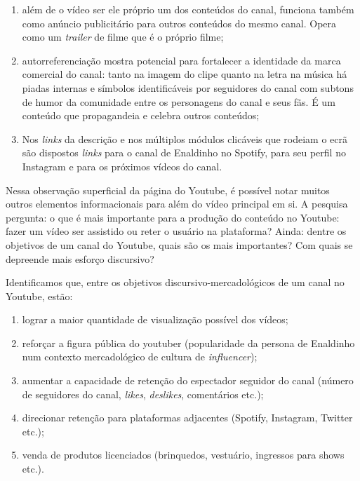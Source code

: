 \documentclass[portuguese]{textolivre}
\begin{document}
 \begin{enumerate}
     \item além de o vídeo ser ele próprio um dos conteúdos do canal, funciona também como anúncio publicitário para outros conteúdos do mesmo canal. Opera como um \textit{trailer} de filme que é o próprio filme;
     \item autorreferenciação mostra potencial para fortalecer a identidade da marca comercial do canal: tanto na imagem do clipe quanto na letra na música há piadas internas e símbolos identificáveis por seguidores do canal com subtons de humor da comunidade entre os personagens do canal e seus fãs. É um conteúdo que propagandeia e celebra outros conteúdos;
    \item Nos \textit{links} da descrição e nos múltiplos módulos clicáveis que rodeiam o ecrã são dispostos \textit{links} para o canal de Enaldinho no Spotify, para seu perfil no Instagram e para os próximos vídeos do canal.
 \end{enumerate}

Nessa observação superficial da página do Youtube, é possível notar muitos outros elementos informacionais para além do vídeo principal em si. A pesquisa pergunta: o que é mais importante para a produção do conteúdo no Youtube: fazer um vídeo ser assistido ou reter o usuário na plataforma? Ainda: dentre os objetivos de um canal do Youtube, quais são os mais importantes? Com quais se depreende mais esforço discursivo?

Identificamos que, entre os objetivos discursivo-mercadológicos de um canal no Youtube, estão:

\begin{enumerate}
    \item lograr a maior quantidade de visualização possível dos vídeos;
    \item reforçar a figura pública do youtuber (popularidade da persona de Enaldinho num contexto mercadológico de cultura de \textit{influencer});
    \item aumentar a capacidade de retenção do espectador seguidor do canal (número de seguidores do canal, \textit{likes}, \textit{deslikes}, comentários etc.);
    \item direcionar retenção para plataformas adjacentes (Spotify, Instagram, Twitter etc.);
    \item venda de produtos licenciados (brinquedos, vestuário, ingressos para shows etc.).
\end{enumerate}
		
\end{document}

